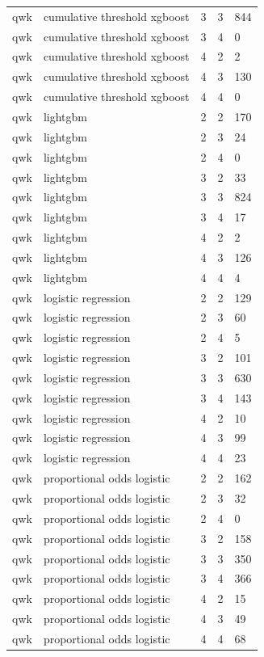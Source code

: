 \documentclass[
  a4paper,
  review]{elsarticle}
\begin{document}
{\begin{longtable}[]{@{}lllll@{}}
qwk & cumulative threshold xgboost & 3 & 3 & 844 \\
qwk & cumulative threshold xgboost & 3 & 4 & 0 \\
qwk & cumulative threshold xgboost & 4 & 2 & 2 \\
qwk & cumulative threshold xgboost & 4 & 3 & 130 \\
qwk & cumulative threshold xgboost & 4 & 4 & 0 \\
qwk & lightgbm & 2 & 2 & 170 \\
qwk & lightgbm & 2 & 3 & 24 \\
qwk & lightgbm & 2 & 4 & 0 \\
qwk & lightgbm & 3 & 2 & 33 \\
qwk & lightgbm & 3 & 3 & 824 \\
qwk & lightgbm & 3 & 4 & 17 \\
qwk & lightgbm & 4 & 2 & 2 \\
qwk & lightgbm & 4 & 3 & 126 \\
qwk & lightgbm & 4 & 4 & 4 \\
qwk & logistic regression & 2 & 2 & 129 \\
qwk & logistic regression & 2 & 3 & 60 \\
qwk & logistic regression & 2 & 4 & 5 \\
qwk & logistic regression & 3 & 2 & 101 \\
qwk & logistic regression & 3 & 3 & 630 \\
qwk & logistic regression & 3 & 4 & 143 \\
qwk & logistic regression & 4 & 2 & 10 \\
qwk & logistic regression & 4 & 3 & 99 \\
qwk & logistic regression & 4 & 4 & 23 \\
qwk & proportional odds logistic & 2 & 2 & 162 \\
qwk & proportional odds logistic & 2 & 3 & 32 \\
qwk & proportional odds logistic & 2 & 4 & 0 \\
qwk & proportional odds logistic & 3 & 2 & 158 \\
qwk & proportional odds logistic & 3 & 3 & 350 \\
qwk & proportional odds logistic & 3 & 4 & 366 \\
qwk & proportional odds logistic & 4 & 2 & 15 \\
qwk & proportional odds logistic & 4 & 3 & 49 \\
qwk & proportional odds logistic & 4 & 4 & 68 \\

\end{longtable}}
\end{document}
